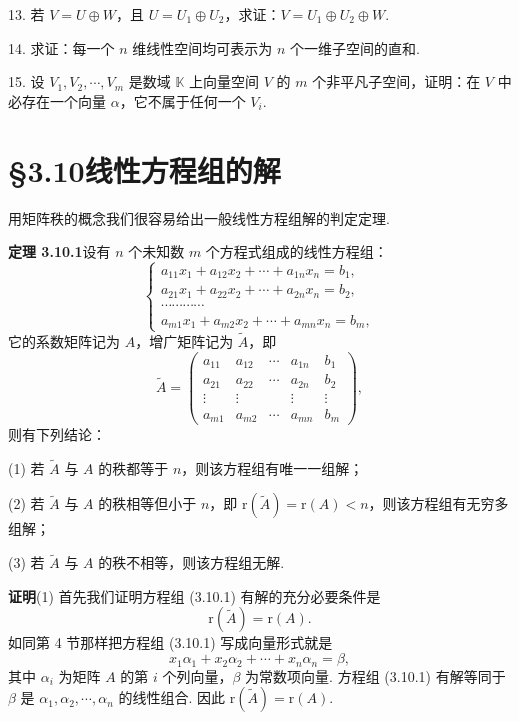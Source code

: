 \documentclass[UTF8, 12pt, fontset=fandol, oneside]{ctexart}
\begin{document}
13. 若 $V=U\oplus W$，且 $U=U_1\oplus U_2$，求证：$V=U_1\oplus U_2\oplus W$.

14. 求证：每一个 $n$ 维线性空间均可表示为 $n$ 个一维子空间的直和.

15. 设 $V_1,V_2,\cdots,V_m$ 是数域 $\mathbb{K}$ 上向量空间 $V$ 的 $m$ 个非平凡子空间，证明：在 $V$ 中必存在一个向量 $\alpha$，它不属于任何一个 $V_i$.

\section*{§3.10\quad 线性方程组的解}

用矩阵秩的概念我们很容易给出一般线性方程组解的判定定理.

\noindent\textbf{定理 3.10.1}\quad 设有 $n$ 个未知数 $m$ 个方程式组成的线性方程组：
\begin{equation}
\left\{\begin{array}{c}
a_{11}x_1+a_{12}x_2+\cdots+a_{1n}x_n=b_1,\\
a_{21}x_1+a_{22}x_2+\cdots+a_{2n}x_n=b_2,\\
\cdots\cdots\cdots\cdots\\
a_{m1}x_1+a_{m2}x_2+\cdots+a_{mn}x_n=b_m,
\end{array}\right.
\tag{3.10.1}
\end{equation}
它的系数矩阵记为 $A$，增广矩阵记为 $\widetilde{A}$，即
\[
\widetilde{A}=\left(\begin{array}{ccccc}
a_{11}&a_{12}&\cdots&a_{1n}&b_1\\
a_{21}&a_{22}&\cdots&a_{2n}&b_2\\
\vdots&\vdots&&\vdots&\vdots\\
a_{m1}&a_{m2}&\cdots&a_{mn}&b_m
\end{array}\right),
\]
则有下列结论：

(1) 若 $\widetilde{A}$ 与 $A$ 的秩都等于 $n$，则该方程组有唯一一组解；

(2) 若 $\widetilde{A}$ 与 $A$ 的秩相等但小于 $n$，即 $\mathrm{r}(\widetilde{A})=\mathrm{r}(A)<n$，则该方程组有无穷多组解；

(3) 若 $\widetilde{A}$ 与 $A$ 的秩不相等，则该方程组无解.

\noindent\textbf{证明}\quad (1) 首先我们证明方程组 (3.10.1) 有解的充分必要条件是
\[
\mathrm{r}(\widetilde{A})=\mathrm{r}(A).
\]
如同第 4 节那样把方程组 (3.10.1) 写成向量形式就是
\begin{equation}
x_1\alpha_1+x_2\alpha_2+\cdots+x_n\alpha_n=\beta,
\tag{3.10.2}
\end{equation}
其中 $\alpha_i$ 为矩阵 $A$ 的第 $i$ 个列向量，$\beta$ 为常数项向量. 方程组 (3.10.1) 有解等同于 $\beta$ 是 $\alpha_1,\alpha_2,\cdots,\alpha_n$ 的线性组合. 因此 $\mathrm{r}(\widetilde{A})=\mathrm{r}(A)$.
\end{document}
